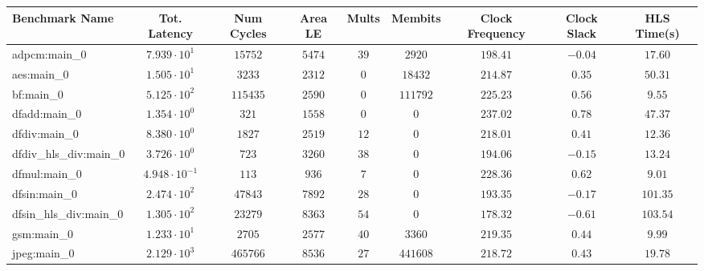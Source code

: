 \begin{tabular}{|l|c|c|c|c|c|c|c|c|}
\hline
Benchmark Name          & Tot. Latency            & Num Cycles & Area LE   & Mults   & Membits    & Clock Frequency & Clock Slack & HLS Time(s) \\
\hline
adpcm:main\_0           & $ 7.939 \cdot 10^{1}  $ & $ 15752  $ & $ 5474  $ & $ 39  $ & $ 2920   $ & $ 198.41      $ & $ -0.04   $ & $ 17.60   $ \\
aes:main\_0             & $ 1.505 \cdot 10^{1}  $ & $ 3233   $ & $ 2312  $ & $ 0   $ & $ 18432  $ & $ 214.87      $ & $ 0.35    $ & $ 50.31   $ \\
bf:main\_0              & $ 5.125 \cdot 10^{2}  $ & $ 115435 $ & $ 2590  $ & $ 0   $ & $ 111792 $ & $ 225.23      $ & $ 0.56    $ & $ 9.55    $ \\
dfadd:main\_0           & $ 1.354 \cdot 10^{0}  $ & $ 321    $ & $ 1558  $ & $ 0   $ & $ 0      $ & $ 237.02      $ & $ 0.78    $ & $ 47.37   $ \\
dfdiv:main\_0           & $ 8.380 \cdot 10^{0}  $ & $ 1827   $ & $ 2519  $ & $ 12  $ & $ 0      $ & $ 218.01      $ & $ 0.41    $ & $ 12.36   $ \\
dfdiv\_hls\_div:main\_0 & $ 3.726 \cdot 10^{0}  $ & $ 723    $ & $ 3260  $ & $ 38  $ & $ 0      $ & $ 194.06      $ & $ -0.15   $ & $ 13.24   $ \\
dfmul:main\_0           & $ 4.948 \cdot 10^{-1} $ & $ 113    $ & $ 936   $ & $ 7   $ & $ 0      $ & $ 228.36      $ & $ 0.62    $ & $ 9.01    $ \\
dfsin:main\_0           & $ 2.474 \cdot 10^{2}  $ & $ 47843  $ & $ 7892  $ & $ 28  $ & $ 0      $ & $ 193.35      $ & $ -0.17   $ & $ 101.35  $ \\
dfsin\_hls\_div:main\_0 & $ 1.305 \cdot 10^{2}  $ & $ 23279  $ & $ 8363  $ & $ 54  $ & $ 0      $ & $ 178.32      $ & $ -0.61   $ & $ 103.54  $ \\
gsm:main\_0             & $ 1.233 \cdot 10^{1}  $ & $ 2705   $ & $ 2577  $ & $ 40  $ & $ 3360   $ & $ 219.35      $ & $ 0.44    $ & $ 9.99    $ \\
jpeg:main\_0            & $ 2.129 \cdot 10^{3}  $ & $ 465766 $ & $ 8536  $ & $ 27  $ & $ 441608 $ & $ 218.72      $ & $ 0.43    $ & $ 19.78   $ \\

\end{tabular}

